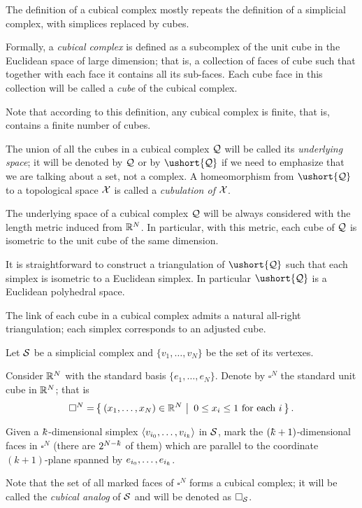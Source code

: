The definition of a cubical complex
mostly repeats the definition of a simplicial complex, 
with simplices replaced by cubes.

Formally, a \emph{cubical complex} is defined as a subcomplex 
of the unit cube in the Euclidean space of large dimension;
that is, a collection of faces of cube
such that together with each face it contains all its sub-faces.
Each cube face in this collection 
will be called a \emph{cube} of the cubical complex.

Note that according to this definition, 
any cubical complex is finite,
that is, contains a finite number of cubes.

The union of all the cubes in a cubical complex $\mathcal{Q}$ will be called its \emph{underlying space};
it will be denoted by $\mathcal{Q}$ or by $\ushort{\spc{Q}}$ 
if we need to emphasize that we are talking about a set, 
not a complex.
A homeomorphism from $\ushort{\spc{Q}}$ to a topological space $\mathcal{X}$ is called a \emph{cubulation of} $\mathcal{X}$.

The underlying space of a cubical complex $\mathcal{Q}$ will be always considered with the length metric
induced from $\mathbb{R}^N$.
In particular, with this metric, 
each cube of $\mathcal{Q}$ is isometric to the unit cube of the same dimension.

It is straightforward to construct a triangulation 
of $\ushort{\spc{Q}}$ 
such that each simplex is isometric to a Euclidean simplex.
In particular $\ushort{\spc{Q}}$ is a Euclidean polyhedral space.

The link of each cube in a cubical complex admits a natural 
all-right triangulation; 
each simplex corresponds to an adjusted cube.

Let $\mathcal{S}$ be a simplicial complex and $\{v_1,\dots,v_N\}$ be the set of its vertexes.

Consider $\mathbb{R}^N$ with the standard basis $\{e_1,\dots,e_N\}$.
Denote by $\square^N$ the standard unit cube in $\mathbb{R}^N$;
that is 
\[\square^N=\set{(x_1,\dots,x_N)\in \RR^N}{0\le x_i\le 1\ \text{for each}\ i}.\]

Given a $\kay$-dimensional simplex $\<v_{i_0},\dots,v_{i_\kay}\>$ in $\mathcal{S}$, 
mark the $(\kay\z+1)$-dimensional faces in $\square^N$ (there are  $2^{N-\kay}$ of them)
which are parallel to the coordinate $(k+1)$-plane 
spanned by $e_{i_0},\dots,e_{i_\kay}$.


Note that the set of all marked faces of $\square^{N}$
forms a cubical complex;
it will be called 
the \emph{cubical analog} of $\mathcal{S}$
and will be denoted as $\square_{\mathcal{S}}$.

